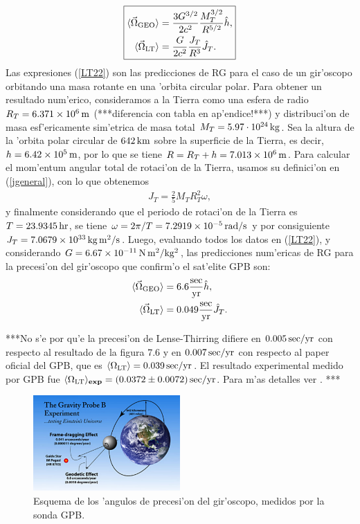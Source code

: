 \begin{equation}\boxed{
\begin{aligned}
\langle\vec{\Omega}_{\rm GEO}\rangle={}&\frac{3G^{3/2}}{2c^2}\frac{M_T^{3/2}}{R^{5/2}}\hat{h},\\
\langle\vec{\Omega}_{\rm LT}\rangle={}&\frac{G}{2c^2}\frac{J_T}{R^3}\hat{J}_T.\label{LT22}
\end{aligned}}
\end{equation}
Las expresiones (\ref{LT22}) son las predicciones de RG para el caso de un gir'oscopo orbitando una masa rotante en una 'orbita circular polar. Para obtener un resultado num'erico, consideramos a la Tierra como una esfera de radio $R_T=6.371\times 10^6\,\rm m$ (***diferencia con tabla en ap'endice!***) y distribuci'on de masa esf'ericamente sim'etrica de masa total $M_T=5.97\cdot 10^{24}\,\rm kg$. Sea la altura de la 'orbita polar circular de $642\,\rm km$ sobre la superficie de la Tierra, es decir, $h=6.42\times 10^5 \,\rm m$, por lo que se tiene $R=R_T+h=7.013\times 10^{6}\,\rm m$. Para calcular el mom'entum angular total de rotaci'on de la Tierra, usamos su definici'on en (\ref{jgeneral}), con lo que obtenemos
\begin{align}
J_T=\frac{2}{5}M_TR_T^2\omega,
\end{align}
y finalmente considerando que el periodo de rotaci'on de la Tierra es $T=23.9345\,\rm hr$, se tiene $\omega=2\pi/T=7.2919\times 10^{-5}\,\rm rad/s$ y por consiguiente $J_T=7.0679\times 10^{33}\,\rm kg\,m^2/s$.
Luego, evaluando todos los datos en (\ref{LT22}), y considerando $G=6.67\times 10^{-11}\,\rm N\,m^2/kg^2$, las predicciones num'ericas de RG para la precesi'on del gir'oscopo que confirm'o el sat'elite GPB son:
\begin{align}
\langle\vec{\Omega}_{\rm GEO}\rangle={}&6.6{\rm \frac{sec}{yr}}\hat{h},\\
\langle\vec{\Omega}_{\rm LT}\rangle={}&0.049{\rm \frac{sec}{yr}}\hat{J}_T.
\end{align}

***No s'e por qu'e la precesi'on de Lense-Thirring difiere en $0.005\,\rm sec/yr$ con respecto al resultado de la figura 7.6 y en $0.007\,\rm sec/yr$ con respecto al paper oficial del GPB, que es $\langle\Omega_{\rm LT}\rangle=0.039\,\rm sec/yr$. El resultado experimental medido por GPB fue $\langle\Omega_{\rm LT}{}\rangle_{\rm\bf exp}=(0.0372\pm 0.0072)\,\rm sec/yr$. Para m'as detalles ver \cite{Everitt11}. ***

\begin{figure}[H]
\centering
\includegraphics[angle=0,width=0.5\textwidth]{fig/fig-precesion.pdf}
\caption{Esquema de los 'angulos de precesi'on del gir'oscopo, medidos por la sonda GPB.}
\label{precesion}
\end{figure}